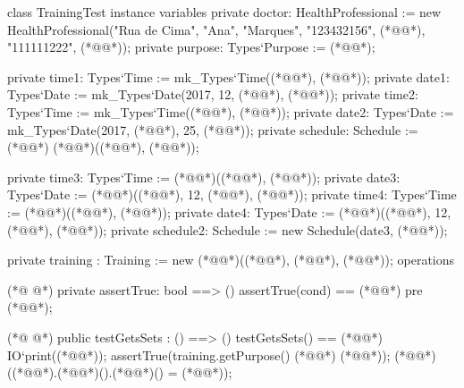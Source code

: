 \begin{vdmpp}[breaklines=true]
class TrainingTest
instance variables
 private doctor: HealthProfessional := new HealthProfessional("Rua de Cima", "Ana", "Marques", "123432156", (*@@*), "111111222", (*@@*));
  private purpose: Types`Purpose := (*@@*);
  
 private time1: Types`Time := mk_Types`Time((*@@*), (*@@*));
 private date1: Types`Date := mk_Types`Date(2017, 12, (*@@*), (*@@*));
 private time2: Types`Time := mk_Types`Time((*@@*), (*@@*));
 private date2: Types`Date := mk_Types`Date(2017, (*@@*), 25, (*@@*));
 private schedule: Schedule := (*@@*) (*@@*)((*@@*), (*@@*));
 
 private time3: Types`Time := (*@@*)((*@@*), (*@@*));
 private date3: Types`Date := (*@@*)((*@@*), 12, (*@@*), (*@@*));
 private time4: Types`Time := (*@@*)((*@@*), (*@@*));
 private date4: Types`Date := (*@@*)((*@@*), 12, (*@@*), (*@@*));
 private schedule2: Schedule := new Schedule(date3, (*@@*));
 
 private training : Training := new (*@@*)((*@@*), (*@@*), (*@@*));
operations
 
(*@
\label{assertTrue:21}
@*)
 private assertTrue: bool ==> ()
  assertTrue(cond) == (*@@*)
 pre (*@@*);
 
(*@
\label{testGetsSets:25}
@*)
 public testGetsSets : () ==> ()
  testGetsSets() == (*@\vdmnotcovered{(}@*)
   IO`print((*@@*));
   assertTrue(training.getPurpose() (*@\vdmnotcovered{=}@*) (*@@*));
   (*@@*)((*@@*).(*@@*)().(*@@*)() = (*@@*));
   

\end{vdmpp}
